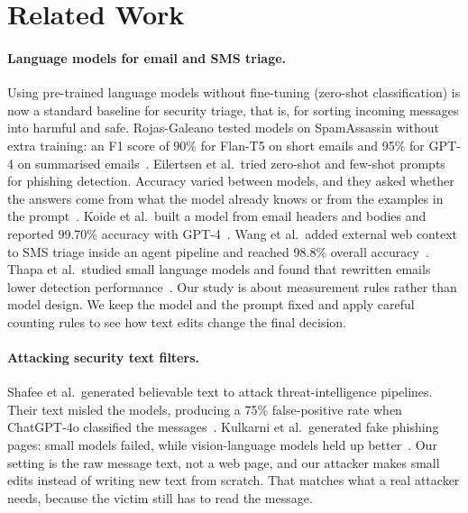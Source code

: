 \section{Related Work}
\label{sec:related}

\paragraph{Language models for email and SMS triage.}
Using pre-trained language models without fine-tuning (zero-shot classification)
is now a standard baseline for security triage, that is, for sorting incoming
messages into harmful and safe. Rojas-Galeano tested models on SpamAssassin
without extra training: an F1 score of 90\% for Flan-T5 on short emails and 95\%
for GPT-4 on summarised emails~\cite{rojas2024zeroshot}. Eilertsen et al.\ tried
zero-shot and few-shot prompts for phishing detection. Accuracy varied between
models, and they asked whether the answers come from what the model already
knows or from the examples in the prompt~\cite{eilertsen2025intent}. Koide et
al.\ built a model from email headers and bodies and reported 99.70\%
accuracy with GPT-4~\cite{koide2024chatspamdetector}. Wang et al.\ added external web context to SMS triage inside an agent pipeline
and reached 98.8\% overall
accuracy~\cite{wang2025smishx}. Thapa et al.\ studied small language models and
found that rewritten emails lower detection performance~\cite{thapa2025quantized}.
Our study is about measurement rules rather than model design. We keep the
model and the prompt fixed and apply careful counting rules to see how text
edits change the final decision.

\paragraph{Attacking security text filters.}
Shafee et al.\ generated believable text to attack threat-intelligence
pipelines. Their text misled the models, producing a 75\% false-positive
rate when ChatGPT-4o classified the messages~\cite{shafee2026falsealarms}.
Kulkarni et al.\ generated fake phishing pages: small models failed, while
vision-language models held up better~\cite{kulkarni2024mltollm}. Our setting is
the raw message text, not a web page, and our attacker makes small edits instead
of writing new text from scratch. That matches what a real attacker needs,
because the victim still has to read the message.

